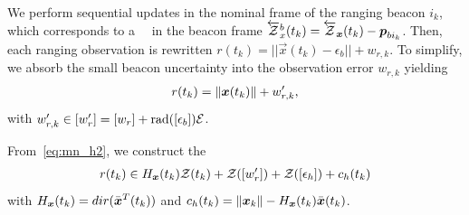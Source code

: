 \documentclass{ifacconf}
\begin{document}
We perform sequential updates in the nominal frame of the ranging beacon $i_k$, which corresponds
to a \apriori\ \cz\ in the beacon frame 
  $\overleftarrow{\mathcal{Z}}^b_{x} (t_k) = \overleftarrow{\mathcal{Z}}_{\boldsymbol{x}} (t_k) - \boldsymbol{p}_{b i_k}$.
%
Then, each ranging observation is rewritten
${r(t_{k}) = ||\vec{x}(t_{k}) - \epsilon_b|| + w_{r,k}}$.
To simplify, we absorb the small beacon uncertainty into the observation error $w_{r,k}$
yielding
\begin{align}
  r(t_{k}) = \lVert\boldsymbol{x}(t_{k})\rVert + w'_{r,k},
  \label{eq:mn_h2}
\end{align}
with ${w'_{r,k} \in [w'_r] = [w_{r}] + \operatorname{rad}([\epsilon_b]) \mathcal{E}}$.

From~\eqref{eq:mn_h2}, we construct the \linearinclusion\
\begin{align}
  {r}(t_{k}) \in
                         H_{\boldsymbol{x}}(t_k)
                         \mathcal{Z} (t_{k})
                         + \mathcal{Z}([w'_r] )
                         + \mathcal{Z}([\epsilon_h])
                         + c_h(t_k)
\end{align}
with
  ${H_{\boldsymbol{x}}(t_k) = \mathop{dir}(\bar{\boldsymbol{x}}^T(t_k))}$
and
${c_h(t_k) = \lVert\boldsymbol{x}_k\rVert - H_{\boldsymbol{x}}({t_k}) \bar{\boldsymbol{x}}(t_k)}$.
\end{document}

